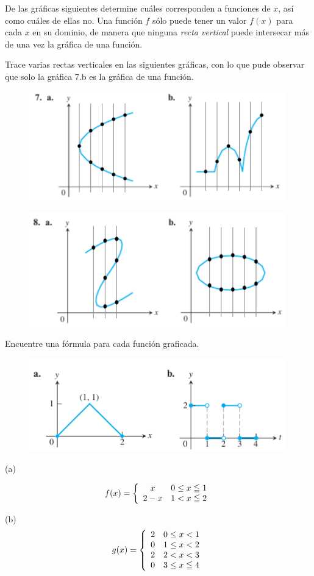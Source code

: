 \documentclass[12pt, letterpaper]{article}
\begin{document}
De las gráficas siguientes determine cuáles corresponden a funciones de  $x$, así como cuáles de ellas no.
Una función $f$ sólo puede tener un valor $f(x)$ para cada $x$ en su dominio, de manera que ninguna \textit{recta vertical} puede intersecar más de una vez la gráfica de una función.

Trace varias rectas verticales en las siguientes gráficas, con lo que pude observar  que solo la gráfica 7.b es la gráfica de una función.
\begin{figure}[h]
\centering
\includegraphics[width=30em]{siete}
\end{figure} 

\begin{figure}[h]
\centering
\includegraphics[width=30em]{ocho}
\end{figure} 

\newpage

Encuentre una fórmula para cada función graficada.
\begin{figure}[h]
\centering
\includegraphics[width=30em]{veinticiete}
\end{figure} 

(a) 

$$f(x) = \left\{
\begin{array}{c l}
 x & 0 \leq x \leqq 1\\
 2-x & 1< x \leqq 2
\end{array}
\right.$$



(b)
$$
g(x) = \left\{
\begin{array}{c l}
 2 & 0 \leq x < 1\\
 0 & 1 \leq x < 2\\
 2 & 2 < x < 3\\
 0 & 3 \leq x \leqq 4
\end{array}
\right.
$$
\end{document}
